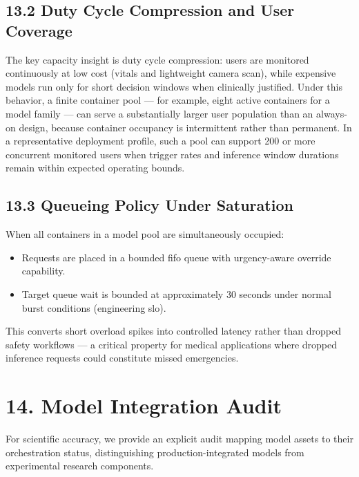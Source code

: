 \documentclass[11pt,a4paper]{article}
\begin{document}
\subsection{13.2 Duty Cycle Compression and User Coverage}
The key capacity insight is duty cycle compression: users are monitored continuously at low cost (vitals and lightweight camera scan), while expensive models run only for short decision windows when clinically justified. Under this behavior, a finite container pool — for example, eight active containers for a model family — can serve a substantially larger user population than an always-on design, because container occupancy is intermittent rather than permanent. In a representative deployment profile, such a pool can support 200 or more concurrent monitored users when trigger rates and inference window durations remain within expected operating bounds.

\subsection{13.3 Queueing Policy Under Saturation}
When all containers in a model pool are simultaneously occupied:
\begin{itemize}[leftmargin=1.4em]
  \item Requests are placed in a bounded \gls{fifo} queue with urgency-aware override capability.
  \item Target queue wait is bounded at approximately 30 seconds under normal burst conditions (engineering \gls{slo}).
 \end{itemize}
This converts short overload spikes into controlled latency rather than dropped safety workflows — a critical property for medical applications where dropped inference requests could constitute missed emergencies.

\section{14. Model Integration Audit}
For scientific accuracy, we provide an explicit audit mapping model assets to their orchestration status, distinguishing production-integrated models from experimental research components.
\end{document}

